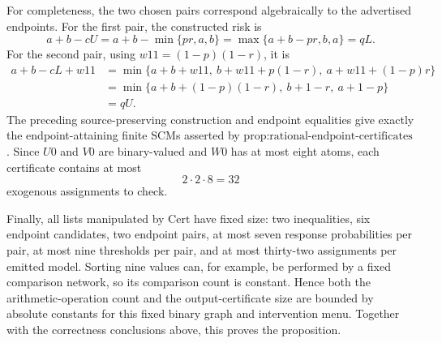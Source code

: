 For completeness, the two chosen pairs correspond algebraically to the advertised endpoints.  For the first pair, the constructed risk is
\[
a+b-cU
=a+b-\min\{pr,a,b\}
=\max\{a+b-pr,b,a\}
=qL.
\]
For the second pair, using \(w11=(1-p)(1-r)\), it is
\[
\begin{aligned}
a+b-cL+w11
&=\min\bigl\{a+b+w11,\ b+w11+p(1-r),\ a+w11+(1-p)r\bigr\}\\
&=\min\bigl\{a+b+(1-p)(1-r),\ b+1-r,\ a+1-p\bigr\}\\
&=qU.
\end{aligned}
\]
The preceding source-preserving construction and endpoint equalities give exactly the endpoint-attaining finite SCMs asserted by \(\text{prop:rational-endpoint-certificates}\).  Since \(U0\) and \(V0\) are binary-valued and \(W0\) has at most eight atoms, each certificate contains at most
\[
2\cdot2\cdot8=32
\]
exogenous assignments to check.

Finally, all lists manipulated by \(\mathrm{Cert}\) have fixed size: two inequalities, six endpoint candidates, two endpoint pairs, at most seven response probabilities per pair, at most nine thresholds per pair, and at most thirty-two assignments per emitted model.  Sorting nine values can, for example, be performed by a fixed comparison network, so its comparison count is constant.  Hence both the arithmetic-operation count and the output-certificate size are bounded by absolute constants for this fixed binary graph and intervention menu.  Together with the correctness conclusions above, this proves the proposition.
